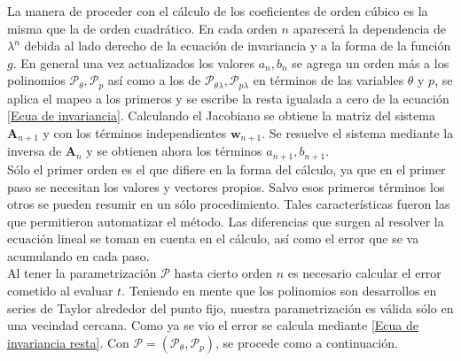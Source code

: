 La manera de proceder con el cálculo de los coeficientes de orden cúbico es la misma que la de orden cuadrático. En cada orden $n$ aparecerá la dependencia de $\lambda^{n}$ debida al lado derecho de la ecuación de invariancia y a la forma de la función $g$. En general una vez actualizados los valores $a_{n},b_{n}$ se agrega un orden más a los polinomios $\mathcal{P}_{\theta},\mathcal{P}_{p}$ así como a los de $\mathcal{P}_{\theta\lambda},\mathcal{P}_{p\lambda}$ en términos de las variables $\theta$ y $p$, se aplica el mapeo a los primeros y se escribe la resta igualada a cero de la ecuación \eqref{Ecua de invariancia}. Calculando el Jacobiano se obtiene la matriz del sistema $\mathbf{A}_{n+1}$ y con los términos independientes $\mathbf{w}_{n+1}$. Se resuelve el sistema mediante la inversa de $\mathbf{A}_{n}$ y se obtienen ahora los términos $a_{n+1},b_{n+1}$.\\

Sólo el primer orden es el que difiere en la forma del cálculo, ya que en el primer paso se necesitan los valores y vectores propios. Salvo esos primeros términos los otros se pueden resumir en un sólo procedimiento. Tales características fueron las que permitieron automatizar el método. Las diferencias que surgen al resolver la ecuación lineal se toman en cuenta en el cálculo, así como el error que se va acumulando en cada paso. \\

Al tener la parametrización $\mathcal{P}$ hasta cierto orden $n$ es necesario calcular el error cometido al evaluar $t$. Teniendo en mente que los polinomios son desarrollos en series de Taylor alrededor del punto fijo, nuestra parametrización es válida sólo en una vecindad cercana. Como ya se vio el error se calcula mediante \eqref{Ecua de invariancia resta}. Con $\mathcal{P}=(\mathcal{P}_{\theta},\mathcal{P}_{p})$, se procede como a continuación.

